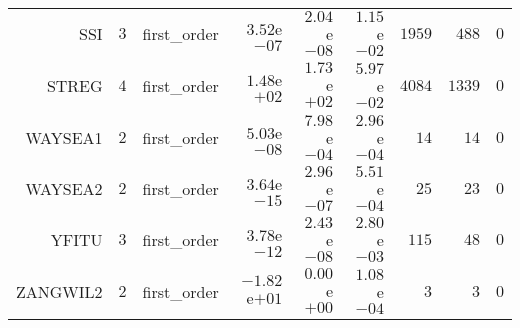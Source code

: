 \begin{longtable}{rrrrrrrrr}
SSI & \(     3\) & first\_order & \( 3.52\)e\(-07\) & \( 2.04\)e\(-08\) & \( 1.15\)e\(-02\) & \(  1959\) & \(   488\) & \(     0\) \\
STREG & \(     4\) & first\_order & \( 1.48\)e\(+02\) & \( 1.73\)e\(+02\) & \( 5.97\)e\(-02\) & \(  4084\) & \(  1339\) & \(     0\) \\
WAYSEA1 & \(     2\) & first\_order & \( 5.03\)e\(-08\) & \( 7.98\)e\(-04\) & \( 2.96\)e\(-04\) & \(    14\) & \(    14\) & \(     0\) \\
WAYSEA2 & \(     2\) & first\_order & \( 3.64\)e\(-15\) & \( 2.96\)e\(-07\) & \( 5.51\)e\(-04\) & \(    25\) & \(    23\) & \(     0\) \\
YFITU & \(     3\) & first\_order & \( 3.78\)e\(-12\) & \( 2.43\)e\(-08\) & \( 2.80\)e\(-03\) & \(   115\) & \(    48\) & \(     0\) \\
ZANGWIL2 & \(     2\) & first\_order & \(-1.82\)e\(+01\) & \( 0.00\)e\(+00\) & \( 1.08\)e\(-04\) & \(     3\) & \(     3\) & \(     0\) \\\hline
\end{longtable}
